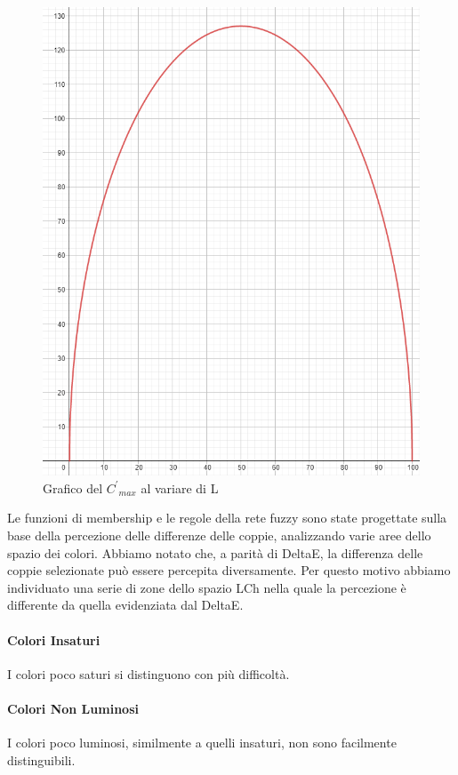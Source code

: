 \begin{figure}[!ht]
\begin{center}
	\includegraphics[scale=0.4]{images/geogebra-export.png}
\end{center}
\caption{Grafico del \({C^{'}}_{max}\) al variare di L}
\end{figure}

Le funzioni di membership e le regole della rete fuzzy sono state progettate sulla base della percezione delle differenze delle coppie, analizzando varie aree dello spazio dei colori. Abbiamo notato che, a parità di DeltaE, la differenza delle coppie selezionate può essere percepita diversamente. Per questo motivo abbiamo individuato una serie di zone dello spazio LCh nella quale la percezione è differente da quella evidenziata dal DeltaE.

\paragraph{Colori Insaturi} I colori poco saturi si distinguono con più difficoltà.
\paragraph{Colori Non Luminosi} I colori poco luminosi, similmente a quelli insaturi, non sono facilmente distinguibili.
